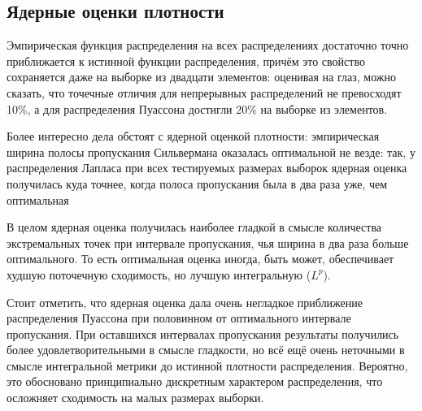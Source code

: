 \subsection{Ядерные оценки плотности}

Эмпирическая функция распределения на всех распределениях достаточно точно приближается к истинной функции распределения, причём это свойство сохраняется даже на выборке из двадцати элементов: оценивая на глаз, можно сказать, что точечные отличия для непрерывных распределений не превосходят 10\%, а для распределения Пуассона достигли 20\% на выборке из 
 элементов.
 
 Более интересно дела обстоят с ядерной оценкой плотности: эмпирическая ширина полосы пропускания Сильвермана оказалась оптимальной не везде: так, у распределения Лапласа при всех тестируемых размерах выборок ядерная оценка получилась куда точнее, когда полоса пропускания была в два раза уже, чем оптимальная
 
 В целом ядерная оценка получилась наиболее гладкой в смысле количества экстремальных точек при интервале пропускания, чья ширина в два раза больше оптимального. То есть оптимальная оценка иногда, быть может, обеспечивает худшую поточечную сходимость, но лучшую интегральную ($L^p$).
 
 Стоит отметить, что ядерная оценка дала очень негладкое приближение распределения Пуассона при половинном от оптимального интервале пропускания. При оставшихся интервалах пропускания результаты получились более удовлетворительными в смысле гладкости, но всё ещё очень неточными в смысле интегральной метрики до истинной плотности распределения.
 Вероятно, это обосновано принципиально дискретным характером распределения, что осложняет сходимость на малых размерах выборки.
